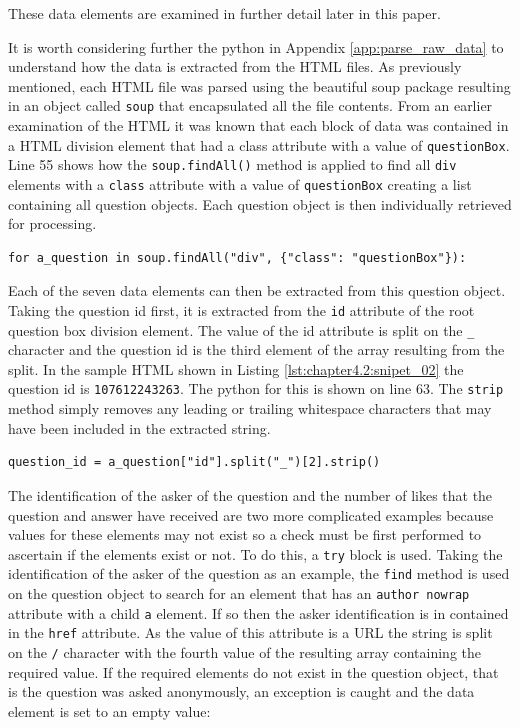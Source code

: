 These data elements are examined in further detail later in this paper.

It is worth considering further the python in Appendix \ref{app:parse_raw_data} to understand how the data is extracted from the HTML files. As previously mentioned, each HTML file was parsed using the beautiful soup package resulting in an object called \verb|soup| that encapsulated all the file contents. From an earlier examination of the HTML it was known that each block of data was contained in a HTML division element that had a class attribute with a value of \verb|questionBox|. Line 55 shows how the \verb|soup.findAll()| method is applied to find all \verb|div| elements with a \verb|class| attribute with a value of \verb|questionBox| creating a list containing all question objects. Each question object is then individually retrieved for processing.

\begin{lstlisting}[firstnumber=55]
for a_question in soup.findAll("div", {"class": "questionBox"}):
\end{lstlisting}

Each of the seven data elements can then be extracted from this question object. Taking the question id first,  it is extracted from the \verb|id| attribute of the root question box division element. The value of the id attribute is split on the \verb|_| character and the question id is the third element of the array resulting from the split. In the sample HTML shown in Listing \ref{lst:chapter4.2:snipet_02} the question id is \verb|107612243263|. The python for this is shown on line 63. The \verb|strip| method simply removes any leading or trailing whitespace characters that may have been included in the extracted string.

\begin{lstlisting}[firstnumber=63]
question_id = a_question["id"].split("_")[2].strip()
\end{lstlisting}

The identification of the asker of the question and the number of likes that the question and answer have received are two more complicated examples because values for these elements may not exist so a check must be first performed to ascertain if the elements exist or not. To do this, a \verb|try| block is used. Taking the identification of the asker of the question as an example, the \verb|find| method is used on the question object to search for an element that has an \verb|author nowrap| attribute with a child \verb|a| element. If so then the asker identification is in contained in the \verb|href| attribute. As the value of this attribute is a URL the string is split on the \verb|/| character with the fourth value of the resulting array containing the required value. If the required elements do not exist in the question object, that is the question was asked anonymously, an exception is caught and the data element is set to an empty value:


